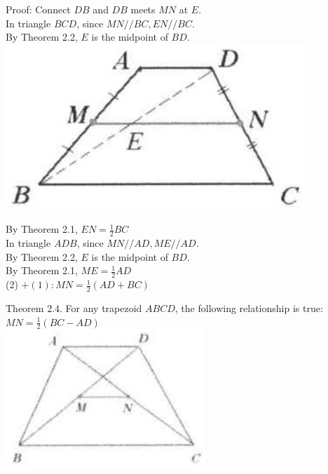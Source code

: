 \documentclass[10pt]{article}
\begin{document}
Proof:
Connect \(D B\) and \(D B\) meets \(M N\) at \(E\).\\
In triangle \(B C D\), since \(M N / / B C, E N / / B C\).\\
By Theorem 2.2, \(E\) is the midpoint of \(B D\).\\
\includegraphics[max width=\textwidth, center]{2025_04_17_97bc1f7e44d93c271a88g-034(2)}

By Theorem 2.1, \(E N=\frac{1}{2} B C\)\\
In triangle \(A D B\), since \(M N / / A D, M E / / A D\).\\
By Theorem 2.2, \(E\) is the midpoint of \(B D\).\\
By Theorem 2.1, \(M E=\frac{1}{2} A D\)\\
(2) \(+(1): M N=\frac{1}{2}(A D+B C)\)

Theorem 2.4. For any trapezoid \(A B C D\), the following relationship is true:\\
\(M N=\frac{1}{2}(B C-A D)\)\\
\includegraphics[max width=\textwidth, center]{2025_04_17_97bc1f7e44d93c271a88g-034}
\end{document}
